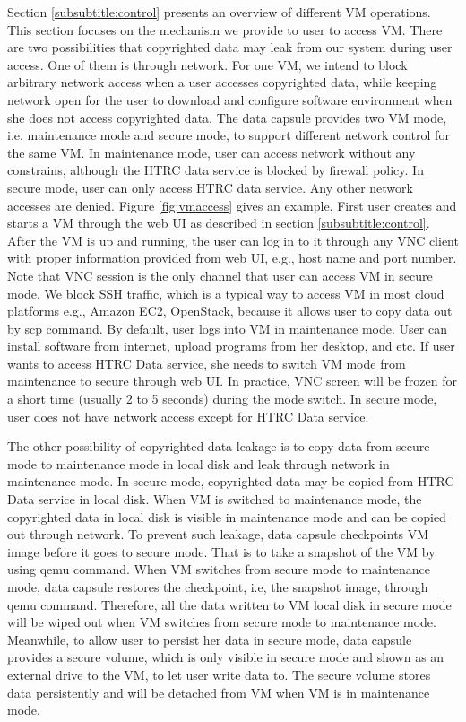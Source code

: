 \documentclass{acm_proc_article-sp}
\begin{document}
Section \ref{subsubtitle:control} presents an overview of different VM operations. This section focuses on the mechanism we provide to user to access VM. There are two possibilities that copyrighted data may leak from our system during user access. One of them is through network. For one VM, we intend to block arbitrary network access when a user accesses copyrighted data, while keeping network open for the user to download and configure software environment when she does not access copyrighted data. The data capsule provides two VM mode, i.e. maintenance mode and secure mode, to support different network control for the same VM. In maintenance mode, user can access network without any constrains, although the HTRC data service is blocked by firewall policy. In secure mode, user can only access HTRC data service. Any other network accesses are denied. Figure \ref{fig:vmaccess} gives an example. First user creates and starts a VM through the web UI as described in section \ref{subsubtitle:control}. After the VM is up and running, the user can log in to it through any VNC client with proper information provided from web UI, e.g., host name and port number. Note that VNC session is the only channel that user can access VM in secure mode. We block SSH traffic, which is a typical way to access VM in most cloud platforms e.g., Amazon EC2, OpenStack, because it allows user to copy data out by scp command. By default, user logs into VM in maintenance mode. User can install software from internet, upload programs from her desktop, and etc. If user wants to access HTRC Data service, she needs to switch VM mode from maintenance to secure through web UI. In practice, VNC screen will be frozen for a short time (usually 2 to 5 seconds) during the mode switch. In secure mode, user does not have network access except for HTRC Data service.

The other possibility of copyrighted data leakage is to copy data from secure mode to maintenance mode in local disk and leak through network in maintenance mode. In secure mode, copyrighted data may be copied from HTRC Data service in local disk. When VM is switched to maintenance mode, the copyrighted data in local disk is visible in maintenance mode and can be copied out through network. To prevent such leakage, data capsule checkpoints VM image before it goes to secure mode. That is to take a snapshot of the VM by using qemu command. When VM switches from secure mode to maintenance mode, data capsule restores the checkpoint, i.e, the snapshot image, through qemu command. Therefore, all the data written to VM local disk in secure mode will be wiped out when VM switches from secure mode to maintenance mode. Meanwhile, to allow user to persist her data in secure mode, data capsule provides a secure volume, which is only visible in secure mode and shown as an external drive to the VM, to let user write data to. The secure volume stores data persistently and will be detached from VM when VM is in maintenance mode.
\end{document}
